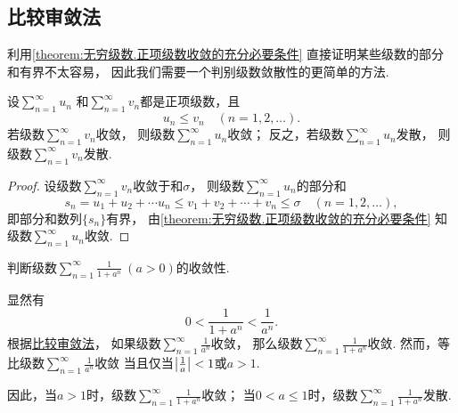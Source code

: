 \subsection{比较审敛法}
利用\cref{theorem:无穷级数.正项级数收敛的充分必要条件} 直接证明某些级数的部分和有界不太容易，
因此我们需要一个判别级数敛散性的更简单的方法.

\begin{theorem}[比较审敛法]\label{theorem:无穷级数.正项级数的比较审敛法}
设\(\sum_{n=1}^\infty u_n\)
和\(\sum_{n=1}^\infty v_n\)都是正项级数，且\[
	u_n \leq v_n
	\quad(n=1,2,\dotsc).
\]
若级数\(\sum_{n=1}^\infty v_n\)收敛，
则级数\(\sum_{n=1}^\infty u_n\)收敛；
反之，若级数\(\sum_{n=1}^\infty u_n\)发散，
则级数\(\sum_{n=1}^\infty v_n\)发散.
\begin{proof}
设级数\(\sum_{n=1}^\infty v_n\)收敛于和\(\sigma\)，
则级数\(\sum_{n=1}^\infty u_n\)的部分和\[
	s_n = u_1 + u_2 + \dotsb u_n
	\leq
	v_1 + v_2 + \dotsb + v_n \leq \sigma
	\quad(n=1,2,\dotsc),
\]
即部分和数列\(\{s_n\}\)有界，
由\cref{theorem:无穷级数.正项级数收敛的充分必要条件} 知级数\(\sum_{n=1}^\infty u_n\)收敛.
\end{proof}
\end{theorem}

\begin{example}
判断级数\(\sum_{n=1}^\infty \frac{1}{1+a^n}\ (a>0)\)的收敛性.
\begin{solution}
显然有\[
	0 < \frac{1}{1+a^n} < \frac{1}{a^n}.
\]
根据\hyperref[theorem:无穷级数.正项级数的比较审敛法]{比较审敛法}，
如果级数\(\sum_{n=1}^\infty \frac{1}{a^n}\)收敛，
那么级数\(\sum_{n=1}^\infty \frac{1}{1+a^n}\)收敛.
然而，等比级数\(\sum_{n=1}^\infty \frac{1}{a^n}\)收敛
当且仅当\(\abs{\frac{1}{a}} < 1\)或\(a > 1\).

因此，当\(a > 1\)时，级数\(\sum_{n=1}^\infty \frac{1}{1+a^n}\)收敛；
当\(0 < a \leq 1\)时，级数\(\sum_{n=1}^\infty \frac{1}{1+a^n}\)发散.
\end{solution}
\end{example}

